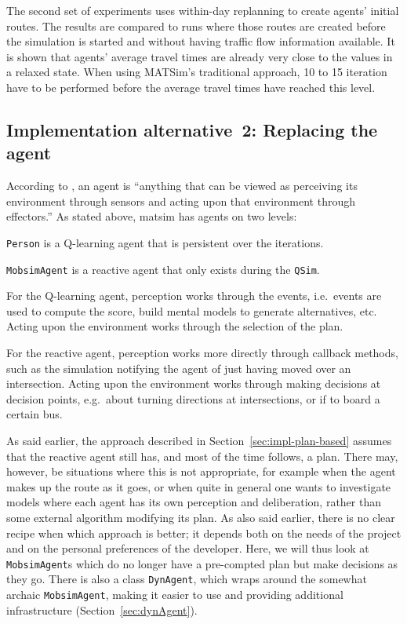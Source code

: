 The second set of experiments uses within-day replanning to create agents' initial routes. The results are compared to runs where those routes are created before the simulation is started and without having traffic flow information available. It is shown that agents' average travel times are already very close to the values in a relaxed state. When using MATSim's traditional approach, 10 to 15 iteration have to be performed before the average travel times have reached this level. %

\subsection{Implementation alternative~2: Replacing the agent}
\label{sec:impl-repl-the-ag}

According to \cite{RussellNorvigBook}, an agent is ``anything that can be viewed as perceiving its environment through sensors and acting upon that environment through effectors.''  As stated above, \acrshort{matsim} has agents on two levels:
\begin{compactitem}

\item \lstinline$Person$ is a Q-learning agent that is persistent over the iterations.

\item \lstinline$MobsimAgent$ is a reactive agent that only exists during the \lstinline$QSim$.

\end{compactitem}

For the Q-learning agent, perception works through the events, i.e.\ events are used to compute the score, build mental models to generate alternatives, etc.  Acting upon the environment works through the selection of the plan.

For the reactive agent, perception works more directly through callback methods, such as the simulation notifying the agent of just having moved over an intersection.  Acting upon the environment works through making decisions at decision points, e.g.\ about turning directions at intersections, or if to board a certain bus.

As said earlier, the approach described in Section~\ref{sec:impl-plan-based} assumes that the reactive agent still has, and most of the time follows, a plan.  There may, however, be situations where this is not appropriate, for example when the agent makes up the route as it goes, or when quite in general one wants to investigate models where each agent has its own perception and deliberation, rather than some external algorithm modifying its plan.  As also said earlier, there is no clear recipe when which approach is better; it depends both on the needs of the project and on the personal preferences of the developer.
%
Here, we will thus look at \lstinline$MobsimAgent$s which do no longer have a pre-compted plan but make decisions as they go.  There is also a class \lstinline$DynAgent$, which wraps around the somewhat archaic \lstinline$MobsimAgent$, making it easier to use and providing additional infrastructure (Section~\ref{sec:dynAgent}).

